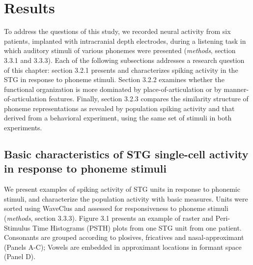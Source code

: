 \section{Results}
To address the questions of this study, we recorded neural activity from six patients, implanted with intracranial depth electrodes, during a listening task in which auditory stimuli of various phonemes were presented (\textit{methods}, section 3.3.1 and 3.3.3). Each of the following subsections addresses a research question of this chapter: section 3.2.1 presents and characterizes spiking activity in the STG in response to phoneme stimuli. Section 3.2.2 examines whether the functional organization is more dominated by place-of-articulation or by manner-of-articulation features. Finally, section 3.2.3 compares the similarity structure of phoneme representations as revealed by population spiking activity and that derived from a behavioral experiment, using the same set of stimuli in both experiments.

\subsection{Basic characteristics of STG single-cell activity in response to phoneme stimuli}
We present examples of spiking activity of STG units in response to phonemic stimuli, and characterize the population activity with basic measures. Units were sorted using WaveClus and assessed for responsiveness to phoneme stimuli (\textit{methods}, section 3.3.3). Figure 3.1 presents an example of raster and Peri-Stimulus Time Histograms (PSTH) plots from one STG unit from one patient. Consonants are grouped according to plosives, fricatives and nasal-approximant (Panels A-C); Vowels are embedded in approximant locations in formant space (Panel D). 

